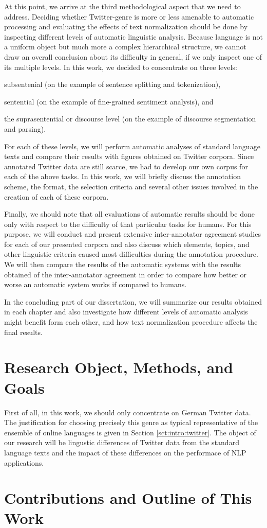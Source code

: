 At this point, we arrive at the third methodological aspect that we need to
address.  Deciding whether Twitter-genre is more or less amenable to automatic
processing and evaluating the effects of text normalization should be done by
inspecting different levels of automatic linguistic analysis.  Because
language is not a uniform object but much more a complex hierarchical
structure, we cannot draw an overall conclusion about its difficulty in
general, if we only inspect one of its multiple levels.  In this work, we
decided to concentrate on three levels:
\begin{inparaenum}
  \item subsentenial (on the example of sentence splitting and tokenization),
  \item sentential (on the example of fine-grained sentiment analysis), and
  \item the suprasentential or discourse level (on the example of discourse
    segmentation and parsing).
\end{inparaenum}

For each of these levels, we will perform automatic analyses of standard
language texts and compare their results with figures obtained on Twitter
corpora.  Since annotated Twitter data are still scarce, we had to develop our
own corpus for each of the above tasks.  In this work, we will briefly discuss
the annotation scheme, the format, the selection criteria and several other
issues involved in the creation of each of these corpora.

Finally, we should note that all evaluations of automatic results should be
done only with respect to the difficulty of that particular tasks for humans.
For this purpose, we will conduct and present extensive inter-annotator
agreement studies for each of our presented corpora and also discuss which
elements, topics, and other linguistic criteria caused most difficulties
during the annotation procedure.  We will then compare the results of the
automatic systems with the results obtained of the inter-annotator agreement
in order to compare how better or worse an automatic system works if compared
to humans.

In the concluding part of our dissertation, we will summarize our results
obtained in each chapter and also investigate how different levels of
automatic analysis might benefit form each other, and how text normalization
procedure affects the final results.

\section{Research Object, Methods, and Goals}
First of all, in this work, we should only concentrate on German Twitter data.
The justification for choosing precisely this genre as typical representative
of the ensemble of online languages is given in Section
\ref{sct:intro:twitter}.  The object of our research will be lingustic
differences of Twitter data from the standard language texts and the impact of
these differences on the performace of NLP applications.

\section{Contributions and Outline of This Work}
